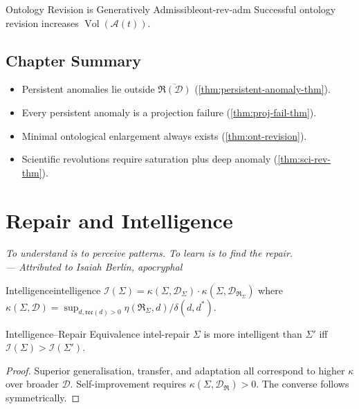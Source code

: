 \documentclass[12pt,twoside,openright]{book}
\newcommand{\adm}{\mathcal{A}}
\newcommand{\repair}{\mathfrak{R}}
\newcommand{\reco}{\mathfrak{rec}}
\newcommand{\Vol}{\operatorname{Vol}}
\newenvironment{epigraph}[2]{%
  \vspace{1em}\begin{flushright}
  \begin{minipage}{0.72\textwidth}
  \itshape\small #1\\[0.4em]
  \upshape\footnotesize\sffamily\color{DistGray}--- #2
  \end{minipage}\end{flushright}\vspace{1.5em}}{}
\newenvironment{chapsummary}{%
  \begin{tcolorbox}[colback=DistBlue!5,colframe=DistBlue,
    title={\faBookOpen\enspace Summary},
    fonttitle=\sffamily\bfseries\color{white},
    attach boxed title to top left={yshift=-2mm,xshift=4mm},
    boxed title style={colback=DistBlue,rounded corners}]
  \begin{itemize}[nosep,leftmargin=*]}{%
  \end{itemize}\end{tcolorbox}}
\begin{document}
\begin{corollary}{Ontology Revision is Generatively
  Admissible}{ont-rev-adm}
  Successful ontology revision increases $\Vol(\adm(t))$.
\end{corollary}

\section*{Chapter Summary}
\begin{chapsummary}
  \item Persistent anomalies lie outside
        $\overline{\repair(\mathcal{D})}$
        (\cref{thm:persistent-anomaly-thm}).
  \item Every persistent anomaly is a projection failure
        (\cref{thm:proj-fail-thm}).
  \item Minimal ontological enlargement always exists
        (\cref{thm:ont-revision}).
  \item Scientific revolutions require saturation plus deep
        anomaly (\cref{thm:sci-rev-thm}).
\end{chapsummary}

\chapter{Repair and Intelligence}
\label{ch:repair-intelligence}
\begin{epigraph}{To understand is to perceive patterns.
  To learn is to find the repair.}%
  {Attributed to Isaiah Berlin, \textit{apocryphal}}
\end{epigraph}

\begin{definition}{Intelligence}{intelligence}
  $\mathcal{I}(\Sigma)
  =\kappa(\Sigma,\mathcal{D}_\Sigma)
  \cdot\kappa(\Sigma,\mathcal{D}_{\repair_\Sigma})$
  where $\kappa(\Sigma,\mathcal{D})
  =\sup_{d,\reco(d)>0}
  \eta(\repair_\Sigma,d)/\delta(d,d^*)$.
\end{definition}

\begin{theorem}{Intelligence--Repair Equivalence}%
  {intel-repair}
  $\Sigma$ is more intelligent than $\Sigma'$ iff
  $\mathcal{I}(\Sigma)>\mathcal{I}(\Sigma')$.
\end{theorem}
\begin{proof}
  Superior generalisation, transfer, and adaptation all
  correspond to higher $\kappa$ over broader $\mathcal{D}$.
  Self-improvement requires
  $\kappa(\Sigma,\mathcal{D}_\repair)>0$.
  The converse follows symmetrically.
\end{proof}
\end{document}
